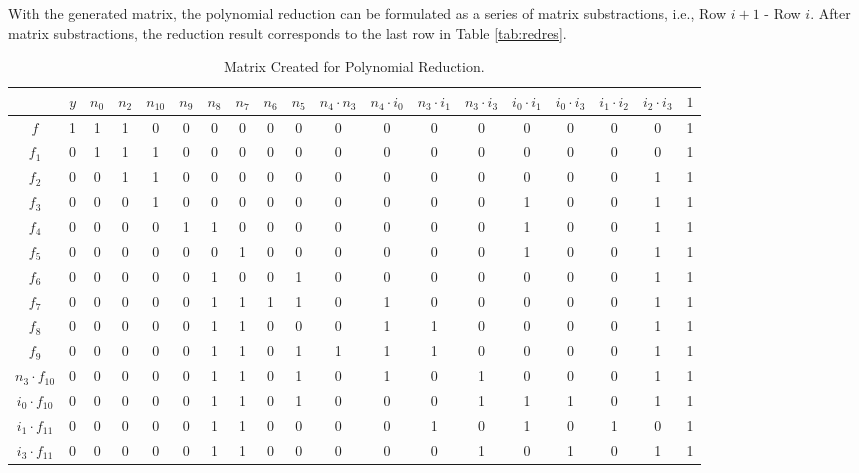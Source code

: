 \begin{Example}
	With the generated matrix, the polynomial reduction can be formulated as a series of matrix substractions, 
	i.e., Row $i+1$ - Row $i$.
	After matrix substractions, the reduction result corresponds to the last row in Table \ref{tab:redres}.
	\begin{table} 
	\begin{center}
	\caption{Matrix Created for Polynomial Reduction.} 
	\label{tab:ourmas}
	\begin{tabular}{|c||c|c|c|c|c|c|c|c|c|c|c|c|c|c|c|c|c|c|} \hline 
				&$y$ 	&$n_0$ &$n_2$	&$n_{10}$	&$n_9$	&$n_8$  &$n_7$	&$n_6$  &$n_5$   &$n_4\cdot n_3$  &$n_4\cdot i_0$ 	&$n_3\cdot i_1$	&$n_3\cdot i_3$	&$i_0\cdot i_1$		&$i_0\cdot i_3$ 	&$i_1\cdot i_2$	 &$i_2\cdot i_3$   &$1$ \\
		\hline
		$f$   		&1	&1	&1	&0	&0	&0	&0	&0	&0	&0	&0	&0	&0	&0	&0	&0	&0	&1 \\
		\hline
		$f_1$ 		&0	&1	&1	&1	&0	&0	&0	&0	&0	&0	&0	&0	&0	&0	&0	&0	&0	&1 \\
		\hline
		$f_2$ 		&0	&0	&1	&1	&0	&0	&0	&0	&0	&0	&0	&0	&0	&0	&0	&0	&1	&1 \\
		\hline
		$f_3$		&0	&0	&0	&1	&0	&0	&0	&0	&0	&0	&0	&0	&0	&1	&0	&0	&1	&1 \\
		\hline
		$f_4$		&0	&0	&0	&0	&1	&1	&0	&0	&0	&0	&0	&0	&0	&1	&0	&0	&1	&1\\
		\hline{}
		$f_5$		&0	&0	&0	&0	&0	&0	&1	&0	&0	&0	&0	&0	&0	&1	&0	&0	&1	&1\\
		\hline{}
		$f_6$		&0	&0	&0	&0	&0	&1	&0	&0	&1	&0	&0	&0	&0	&0	&0	&0	&1	&1\\
		\hline{}
		$f_7$		&0	&0	&0	&0	&0	&1	&1	&1	&1	&0	&1	&0	&0	&0	&0	&0	&1	&1\\
		\hline{}
		$f_8$		&0	&0	&0	&0	&0	&1	&1	&0	&0	&0	&1	&1	&0	&0	&0	&0	&1	&1\\
		\hline{}
		$f_9$		&0	&0	&0	&0	&0	&1	&1	&0	&1	&1	&1	&1	&0	&0	&0	&0	&1	&1\\
	\hline{}
$n_3\cdot f_{10}$	&0	&0	&0	&0	&0	&1	&1	&0	&1	&0	&1	&0	&1	&0	&0	&0	&1	&1\\
	\hline{}
$i_0\cdot f_{10}$ 	&0	&0	&0	&0	&0	&1	&1	&0	&1	&0	&0	&0	&1	&1	&1	&0	&1	&1\\
	\hline{}
$i_1 \cdot f_{11}$	&0	&0	&0	&0	&0	&1	&1	&0	&0	&0	&0	&1	&0	&1	&0	&1	&0	&1\\
	\hline{}
$i_3 \cdot f_{11}$	&0	&0	&0	&0	&0	&1	&1	&0	&0	&0	&0	&0	&1	&0	&1	&0	&1	&1\\
	\hline
	\end{tabular}
	\end{center}
	\end{table} 
\end{Example}

